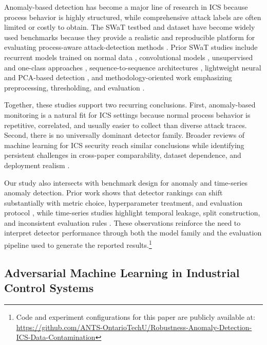 \documentclass[10pt,conference]{IEEEtran}
\begin{document}
Anomaly-based detection has become a major line of research in ICS because process behavior is highly structured, while comprehensive attack labels are often limited or costly to obtain. The SWaT testbed and dataset have become widely used benchmarks because they provide a realistic and reproducible platform for evaluating process-aware attack-detection methods \cite{mathur2016swat,goh2017dataset}. Prior SWaT studies include recurrent models trained on normal data \cite{goh2017rnn}, convolutional models \cite{kravchik2018cnn}, unsupervised and one-class approaches \cite{inoue2017unsupervised}, sequence-to-sequence architectures \cite{kim2020seq2seq}, lightweight neural and PCA-based detection \cite{kravchik2022lightweight}, and methodology-oriented work emphasizing preprocessing, thresholding, and evaluation \cite{gomez2020madics}.

Together, these studies support two recurring conclusions. First, anomaly-based monitoring is a natural fit for ICS settings because normal process behavior is repetitive, correlated, and usually easier to collect than diverse attack traces. Second, there is no universally dominant detector family. Broader reviews of machine learning for ICS security reach similar conclusions while identifying persistent challenges in cross-paper comparability, dataset dependence, and deployment realism \cite{koay2023landscape,ramachandran2021challenges}.

Our study also intersects with benchmark design for anomaly and time-series anomaly detection. Prior work shows that detector rankings can shift substantially with metric choice, hyperparameter treatment, and evaluation protocol \cite{campos2016evaluation,schmidl2022comprehensive,wenig2022timeeval}, while time-series studies highlight temporal leakage, split construction, and inconsistent evaluation rules \cite{kim2022rigorous,huet2022local}. These observations reinforce the need to interpret detector performance through both the model family and the evaluation pipeline used to generate the reported results.\footnote{Code and experiment configurations for this paper are publicly available at: \url{https://github.com/ANTS-OntarioTechU/Robustness-Anomaly-Detection-ICS-Data-Contamination}}

\subsection{Adversarial Machine Learning in Industrial Control Systems}
\end{document}
